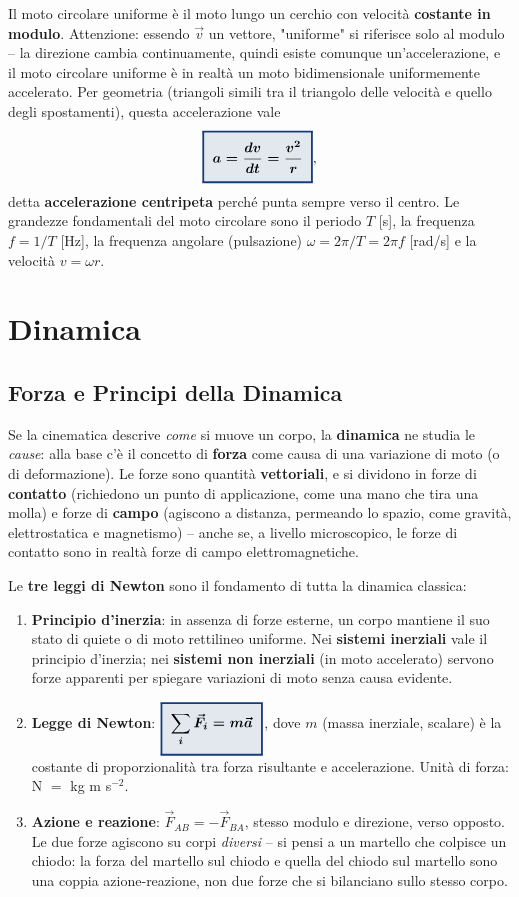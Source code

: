 \documentclass[a4paper,11pt]{article}
\newcommand{\keyeq}[1]{{\setlength{\fboxsep}{6pt}\setlength{\fboxrule}{1.3pt}\fcolorbox{chapblue}{chapblue!12}{\boldmath$\displaystyle #1$}}}
\begin{document}
Il moto circolare uniforme è il moto lungo un cerchio con velocità \textbf{costante in modulo}. Attenzione: essendo $\vec v$ un vettore, "uniforme" si riferisce solo al modulo -- la direzione cambia continuamente, quindi esiste comunque un'accelerazione, e il moto circolare uniforme è in realtà un moto bidimensionale uniformemente accelerato. Per geometria (triangoli simili tra il triangolo delle velocità e quello degli spostamenti), questa accelerazione vale
\[
\keyeq{a = \frac{dv}{dt} = \frac{v^2}{r}},
\]
detta \textbf{accelerazione centripeta} perché punta sempre verso il centro. Le grandezze fondamentali del moto circolare sono il periodo $T$ [s], la frequenza $f=1/T$ [Hz], la frequenza angolare (pulsazione) $\omega=2\pi/T=2\pi f$ [rad/s] e la velocità $v=\omega r$.

\newpage
\section{Dinamica}

\subsection{Forza e Principi della Dinamica}

Se la cinematica descrive \emph{come} si muove un corpo, la \textbf{dinamica} ne studia le \emph{cause}: alla base c'è il concetto di \textbf{forza} come causa di una variazione di moto (o di deformazione). Le forze sono quantità \textbf{vettoriali}, e si dividono in forze di \textbf{contatto} (richiedono un punto di applicazione, come una mano che tira una molla) e forze di \textbf{campo} (agiscono a distanza, permeando lo spazio, come gravità, elettrostatica e magnetismo) -- anche se, a livello microscopico, le forze di contatto sono in realtà forze di campo elettromagnetiche.

Le \textbf{tre leggi di Newton} sono il fondamento di tutta la dinamica classica:
\begin{enumerate}
  \item \textbf{Principio d'inerzia}: in assenza di forze esterne, un corpo mantiene il suo stato di quiete o di moto rettilineo uniforme. Nei \textbf{sistemi inerziali} vale il principio d'inerzia; nei \textbf{sistemi non inerziali} (in moto accelerato) servono forze apparenti per spiegare variazioni di moto senza causa evidente.
  \item \textbf{Legge di Newton}: $\keyeq{\sum_i \vec F_i = m\vec a}$, dove $m$ (massa inerziale, scalare) è la costante di proporzionalità tra forza risultante e accelerazione. Unità di forza: N $=$ kg m s$^{-2}$.
  \item \textbf{Azione e reazione}: $\vec F_{AB} = -\vec F_{BA}$, stesso modulo e direzione, verso opposto. Le due forze agiscono su corpi \emph{diversi} -- si pensi a un martello che colpisce un chiodo: la forza del martello sul chiodo e quella del chiodo sul martello sono una coppia azione-reazione, non due forze che si bilanciano sullo stesso corpo.
\end{enumerate}
\end{document}
